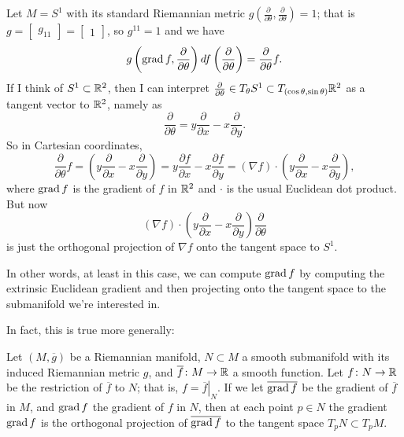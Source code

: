 \begin{example}
	Let $M = S^1$ with its standard Riemannian metric $g\left(\frac{\partial}{\partial \theta},\frac{\partial}{\partial \theta}\right) = 1$; that is $g = \begin{bmatrix}g_{11} \end{bmatrix} = \begin{bmatrix} 1 \end{bmatrix}$, so $g^{11} = 1$ and we have
	\[
		g\left(\operatorname{grad} f, \frac{\partial}{\partial \theta}\right) df\left( \frac{\partial}{\partial \theta} \right) = \frac{\partial }{\partial \theta} f.
	\]
	If I think of $S^1 \subset \mathbb{R}^2$, then I can interpret $\frac{\partial}{\partial \theta} \in T_{\theta} S^1 \subset T_{(\cos \theta,\sin \theta)} \mathbb{R}^2$ as a tangent vector to $\mathbb{R}^2$, namely as 
	\[
		\frac{\partial}{\partial \theta} = y \frac{\partial}{\partial x} -x \frac{\partial}{\partial y}.
	\]
	So in Cartesian coordinates,
	\[
		\frac{\partial }{\partial \theta} f = \left(y \frac{\partial}{\partial x} -x \frac{\partial}{\partial y} \right) = y \frac{\partial f}{\partial x} - x \frac{\partial f}{\partial y} = (\nabla f) \cdot \left( y\frac{\partial}{\partial x} - x\frac{\partial}{\partial y}\right),
	\]
	where $\operatorname{grad} f$ is the gradient of $f$ in $\mathbb{R}^2$ and $\cdot $ is the usual Euclidean dot product. But now
	\[
		(\nabla f) \cdot \left( y\frac{\partial}{\partial x} - x\frac{\partial}{\partial y}\right) \frac{\partial}{\partial \theta}
	\]
	is just the orthogonal projection of $\nabla f$ onto the tangent space to $S^1$.
	
	In other words, at least in this case, we can compute $\operatorname{grad} f$ by computing the extrinsic Euclidean gradient and then projecting onto the tangent space to the submanifold we're interested in.
\end{example}

In fact, this is true more generally:

\begin{proposition}\label{prop:gradient projection}
	Let $(M,\overline{g})$ be a Riemannian manifold, $N \subset M$ a smooth submanifold with its induced Riemannian metric $g$, and $\overline{f} \colon\thinspace\! M \to \mathbb{R}$ a smooth function. Let $f \colon\thinspace\! N \to \mathbb{R}$ be the restriction of $\overline{f}$ to $N$; that is, $f = \left. \overline{f} \right|_N$. If we let $\overline{\operatorname{grad} f}$ be the gradient of $\overline{f}$ in $M$, and $\operatorname{grad} f$ the gradient of $f$ in $N$, then at each point $p \in N$ the gradient $\operatorname{grad} f$ is the orthogonal projection of $\overline{\operatorname{grad} f}$ to the tangent space $T_pN \subset T_pM$.
\end{proposition}

